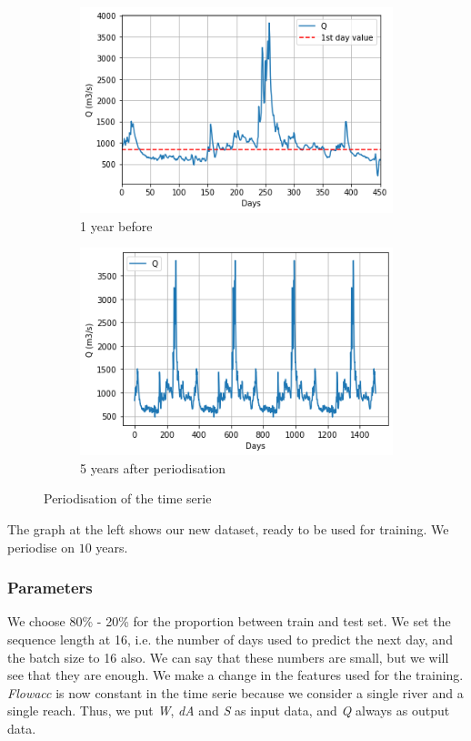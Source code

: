 \begin{figure}[H]
    \begin{subfigure}{0.45 \textwidth}
        \centering
        \includegraphics[scale = 0.5]{Graph/1year.png}
        \caption{1 year before}
        \label{fig:my_label}
    \end{subfigure}
    \centering
     \begin{subfigure}{0.45 \textwidth}
         \centering
        \includegraphics[scale = 0.5]{Graph/5years.png}
        \caption{5 years after periodisation}
        \label{fig:my_label}
     \end{subfigure}
 
 \caption{Periodisation of the time serie}
\end{figure}

The graph at the left shows our new dataset, ready to be used for training. We periodise on $10$ years.

\subsubsection{Parameters}

We choose 80\% - 20\% for the proportion between train and test set. We set the sequence length at 16, i.e. the number of days used to predict the next day, and the batch size to 16 also. We can say that these numbers are small, but we will see that they are enough. We make a change in the features used for the training. \textit{Flowacc} is now constant in the time serie because we consider a single river and a single reach. Thus, we put \textit{W}, \textit{dA} and \textit{S} as input data, and \textit{Q} always as output data. \\

